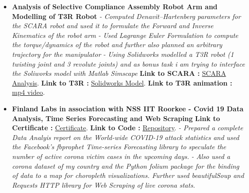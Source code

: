 \documentclass[a4paper,12pt]{article}
\begin{document}
\begin{itemize}
    \item{\textbf{\large{Analysis of Selective Compliance Assembly Robot Arm and Modelling of T3R Robot}}
          \newline
          \textit{- Computed Denavit–Hartenberg parameters for the SCARA robot and used it to formulate the Forward and Inverse Kinematics of the robot arm}
          \newline
          \textit{- Used Lagrange Euler Formulation to compute the torque/dynamics of the robot and further also planned an arbitrary trajectory for the manipulator}
          \newline
          \textit{- Using Solidworks modelled a T3R robot (1 twisting joint and 3 revolute joints) and as bonus task i am trying to interface the Soliworks model with Matlab Simscape}}
          \newline
          \textbf{ Link to SCARA :} \href{https://github.com/teetangh/Robotics-Projects/blob/master/SCARA_Robot_Analysis.pdf}{SCARA Analysis}.
          \newline
          \textbf{ Link to T3R :} \href{https://github.com/teetangh/Robotics-Projects/tree/master/T3R%20Robot}{Solidworks Model}.
          \textbf{ Link to T3R animation :} \href{https://github.com/teetangh/Robotics-Projects/blob/master/T3R%20Robot/Resources/T3R%20Animation.mp4}{mp4 video}.
          \newline
    \item{\textbf{\large{Finland Labs in association with NSS IIT Roorkee - Covid 19 Data Analysis, Time Series Forecasting and Web Scraping}}
          \newline
          \textbf{Link to Certificate :} \href{https://github.com/teetangh/Kaustav-All-Certifications/blob/master/Artificial%20Intelligence/Finland%20Labs%20and%20IITR/Covid%2019%20Analysis%20-%20AI%20and%20ML.pdf}{Certificate}.
              \textbf{ Link to Code :} \href{https://github.com/teetangh/FinlandLabs-IITR-COVID-19-Analysis}{Repository}.
              \newline
              \textit{- Prepared a complete Data Analyis report on the World-wide COVID-19 attack statistics and used the Facebook's fbprophet Time-series Forecasting library to speculate the number of active corona victim cases in the upcoming days.}
              \newline
              \textit{- Also used a corona dataset of my country and the Python folium package for the binding of data to a map for choropleth visualizations. Further used beautifulSoup and Requests HTTP library for Web Scraping of live corona stats.}
}
\end{itemize}
\end{document}
